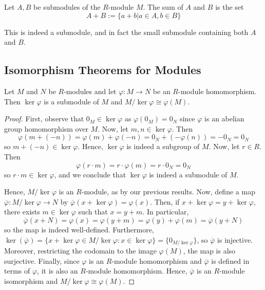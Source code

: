 \begin{defn}
    Let $A,B$ be submodules of the $R$-module $M$. The sum of $A$ and $B$ is the set \begin{equation*}
        A+B := \{a+b\vert a\in A, b \in B\}
    \end{equation*}
\end{defn}

This is indeed a submodule, and in fact the small submodule containing both $A$ and $B$.

\subsection{\textsection Isomorphism Theorems for Modules}

\begin{namthm}\label{thmname:fisomod}
    Let $M$ and $N$ be $R$-modules and let $\varphi:M\rightarrow N$ be an $R$-module homomorphism. Then $\ker\varphi$ is a submodule of $M$ and $M/\ker\varphi\cong \varphi(M)$.
\end{namthm}
\begin{proof}
    First, observe that $0_M \in \ker \varphi$ as $\varphi(0_M) = 0_N$ since $\varphi$ is an abelian group homomorphism over $M$. Now, let $m,n \in \ker\varphi$. Then \begin{equation*}
        \varphi(m+(-n)) = \varphi(m)+\varphi(-n) = 0_N+(-\varphi(n)) = -0_N = 0_N
    \end{equation*}
    so $m+(-n) \in \ker\varphi$. Hence, $\ker\varphi$ is indeed a subgroup of $M$. Now, let $r \in R$. Then $$\varphi(r\cdot m) = r\cdot \varphi(m) = r\cdot 0_N = 0_N$$
    so $r\cdot m \in \ker\varphi$, and we conclude that $\ker\varphi$ is indeed a submodule of $M$.

    Hence, $M/\ker\varphi$ is an $R$-module, as by our previous results. Now, define a map $\overline{\varphi}:M/\ker\varphi\rightarrow N$ by $\overline{\varphi}(x+\ker\varphi) = \varphi(x)$. Then, if $x+\ker\varphi = y + \ker\varphi$, there exists $m \in \ker\varphi$ such that $x= y + m$. In particular, \begin{equation*}
        \overline{\varphi}(x+N) = \varphi(x) = \varphi(y+m) = \varphi(y)+\varphi(m)= \overline{\varphi}(y+N)
    \end{equation*}
    so the map is indeed well-defined. Furthermore, $\ker(\overline{\varphi}) = \{x+\ker\varphi\in M/\ker\varphi:x \in \ker\varphi\} = \{0_{M/\ker\varphi}\}$, so $\overline{\varphi}$ is injective. Moreover, restricting the codomain to the image $\varphi(M)$, the map is also surjective. Finally, since $\varphi$ is an $R$-module homomorphism and $\overline{\varphi}$ is defined in terms of $\varphi$, it is also an $R$-module homomorphism. Hence, $\overline{\varphi}$ is an $R$-module isomorphism and $M/\ker\varphi\cong\varphi(M)$. 
\end{proof}


